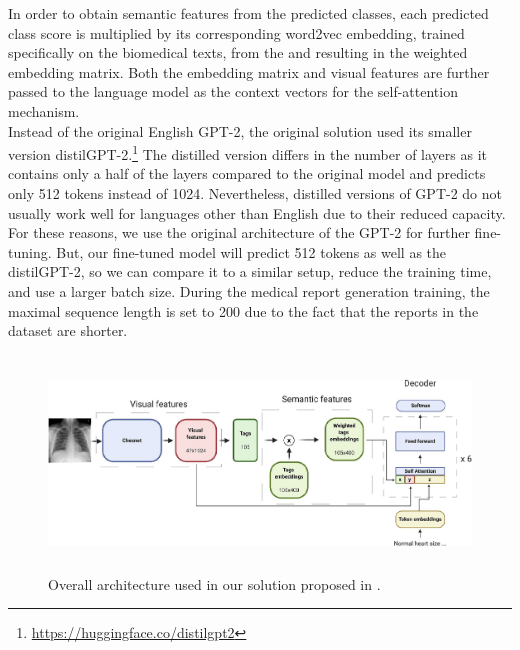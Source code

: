 In order to obtain semantic features from the predicted classes, each predicted class score is multiplied by its corresponding word2vec\citep{mikolov2013distributed} embedding, trained specifically on the biomedical texts, from the \citet{mcdonald2018deep} and resulting in the weighted embedding matrix. Both the embedding matrix and visual features are further passed to the language model as the context vectors for the self-attention mechanism.\\

Instead of the original English GPT-2, the original solution used its smaller version distilGPT-2.\footnote[2]{\url{https://huggingface.co/distilgpt2}} The distilled version differs in the number of layers as it contains only a half of the layers compared to the original model and predicts only 512 tokens instead of 1024. Nevertheless, distilled versions of GPT-2 do not usually work well for languages other than English due to their reduced capacity. For these reasons, we use the original architecture of the GPT-2 for further fine-tuning. But, our fine-tuned model will predict 512 tokens as well as the distilGPT-2, so we can compare it to a similar setup, reduce the training time, and use a larger batch size. During the medical report generation training, the maximal sequence length is set to 200 due to the fact that the reports in the dataset are shorter.\\
 
\begin{figure}[h]\centering
\includegraphics[width=145mm, height=57mm]{../img/OmarArchitecture}
\caption{Overall architecture used in our solution proposed in \citet{alfarghaly2021automated}.}
\label{fig01:OmarArchitecutre}
\end{figure}

